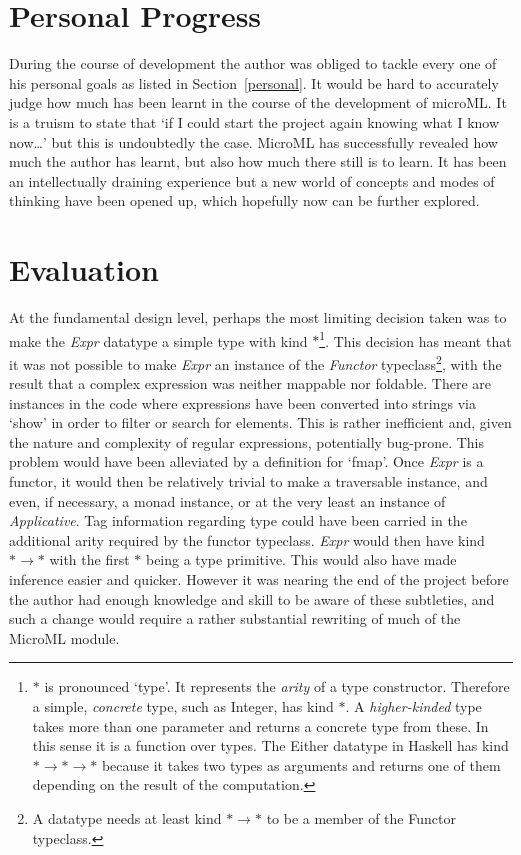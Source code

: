 \documentclass[12pt, a4paper]{report}
\begin{document}
\section{Personal Progress}
During the course of development the author was obliged to tackle every one of his personal goals as
listed in Section~\ref{personal}. It would be hard to accurately judge how much has been learnt in
the course of the development of microML\@. It is a truism to state that `if I could start the
project again knowing what I know now\dots' but this is undoubtedly the case. MicroML has
successfully revealed how much the author has learnt, but also how much there still is to learn. It
has been an intellectually draining experience but a new world of concepts and modes of thinking
have been opened up, which hopefully now can be further explored.

\section{Evaluation}
At the fundamental design level, perhaps the most limiting decision taken was to make the
\textit{Expr} datatype a simple type with kind $*$\footnote{$*$ is pronounced `type'. It represents
the \textit{arity} of a type constructor. Therefore a simple, \textit{concrete} type, such as
Integer, has kind $*$. A \textit{higher-kinded} type takes more than one parameter and returns a
concrete type from these. In this sense it is a function over types. The Either datatype in Haskell
has kind $* \rightarrow * \rightarrow *$ because it takes two types as arguments and returns one
of them depending on the result of the computation.}. This decision has meant that it was not
possible to make \textit{Expr} an instance of the \textit{Functor} typeclass\footnote{A datatype
needs at least kind $* \rightarrow *$ to be a member of the Functor typeclass.}, with the result
that a complex expression was neither mappable nor foldable. There are instances in the code
where expressions have been converted into strings via `show' in order to filter or search for
elements. This is rather inefficient and, given the nature and complexity of regular expressions,
potentially bug-prone. This problem would have been alleviated by a definition for `fmap'. Once
\textit{Expr} is a functor, it would then be relatively trivial to make a traversable instance, and
even, if necessary, a monad instance, or at the very least an instance of \textit{Applicative}. Tag
information regarding type could have been carried in the additional arity required by the functor
typeclass. \textit{Expr} would then have kind $* \rightarrow *$ with the first $*$ being a type
primitive. This would also have made inference easier and quicker. However it was nearing the end of
the project before the author had enough knowledge and skill to be aware of these subtleties, and
such a change would require a rather substantial rewriting of much of the MicroML module.
\end{document}

